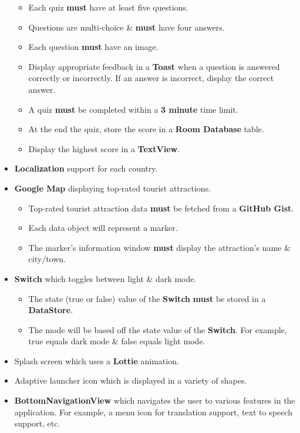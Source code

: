 \documentclass{article}
\begin{document}
\begin{itemize}
\begin{itemize}
	      	\item Each quiz \textbf{must} have at least five questions.
	      	\item Questions are multi-choice \& \textbf{must} have four answers.
	      	\item Each question \textbf{must} have an image.
	      	\item Display appropriate feedback in a \textbf{Toast} when a question is answered correctly or incorrectly. If an answer is incorrect, display the correct answer.
	      	\item A quiz \textbf{must} be completed within a \textbf{3 minute} time limit.
	      	\item At the end the quiz, store the score in a \textbf{Room Database} table.
	      	\item Display the highest score in a \textbf{TextView}.
	      \end{itemize}
	\item \textbf{Localization} support for each country.
	\item \textbf{Google Map} displaying top-rated tourist attractions. 
	      \begin{itemize}
	      	\item Top-rated tourist attraction data \textbf{must} be fetched from a \textbf{GitHub Gist}.
	      	\item Each data object will represent a marker.
	      	\item The marker's information window \textbf{must} display the attraction's name \& city/town.
	      \end{itemize}
	\item \textbf{Switch} which toggles between light \& dark mode.
	      \begin{itemize}
	      	\item The state (true or false) value of the \textbf{Switch} \textbf{must} be stored in a \textbf{DataStore}.
	      	\item The mode will be based off the state value of the \textbf{Switch}. For example, true equals dark mode \& false equals light mode.
	      \end{itemize}
	\item Splash screen which uses a \textbf{Lottie} animation.
	\item Adaptive launcher icon which is displayed in a variety of shapes.
	\item \textbf{BottomNavigationView} which navigates the user to various features in the application. For example, a menu icon for translation support, text to speech support, etc.

\end{itemize}
\end{document}
